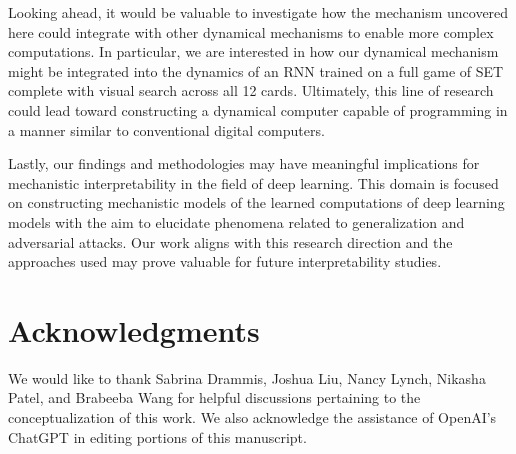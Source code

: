 \documentclass[conference]{IEEEtran}
\begin{document}
Looking ahead, it would be valuable to investigate how the mechanism uncovered here could integrate with other dynamical mechanisms to enable more complex computations. In particular, we are interested in how our dynamical mechanism might be integrated into the dynamics of an RNN trained on a full game of SET complete with visual search across all 12 cards\cite{gordon2017joy}. Ultimately, this line of research could lead toward constructing a dynamical computer capable of programming in a manner similar to conventional digital computers\cite{jaeger2021towards}.

Lastly, our findings and methodologies may have meaningful implications for mechanistic interpretability in the field of deep learning. This domain is focused on constructing mechanistic models of the learned computations of deep learning models with the aim to elucidate phenomena related to generalization and adversarial attacks\cite{power2022grokking,nanda2023progress}. Our work aligns with this research direction and the approaches used may prove valuable for future interpretability studies.

\section*{Acknowledgments}

We would like to thank Sabrina Drammis, Joshua Liu, Nancy Lynch, Nikasha Patel, and Brabeeba Wang for helpful discussions pertaining to the conceptualization of this work. We also acknowledge the assistance of OpenAI's ChatGPT in editing portions of this manuscript.
\end{document}
